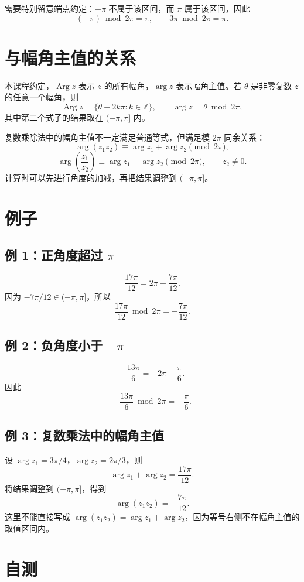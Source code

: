 \documentclass[UTF8,11pt]{ctexart}
\newcommand{\Z}{\mathbb{Z}}
\newcommand{\Arg}{\operatorname{Arg}}
\begin{document}
需要特别留意端点约定：$-\pi$ 不属于该区间，而 $\pi$ 属于该区间，因此
\[
(-\pi)\bmod 2\pi=\pi,
\qquad
3\pi\bmod 2\pi=\pi.
\]

\section{与幅角主值的关系}

本课程约定，$\Arg z$ 表示 $z$ 的所有幅角，$\arg z$ 表示幅角主值。若 $\theta$ 是非零复数 $z$ 的任意一个幅角，则
\[
\Arg z=\{\theta+2k\pi:k\in\Z\},
\qquad
\arg z=\theta\bmod 2\pi,
\]
其中第二个式子的结果取在 $(-\pi,\pi]$ 内。

复数乘除法中的幅角主值不一定满足普通等式，但满足模 $2\pi$ 同余关系：
\[
\arg(z_1z_2)\equiv\arg z_1+\arg z_2\pmod{2\pi},
\]
\[
\arg\left(\frac{z_1}{z_2}\right)
\equiv\arg z_1-\arg z_2\pmod{2\pi},
\qquad z_2\ne0.
\]
计算时可以先进行角度的加减，再把结果调整到 $(-\pi,\pi]$。

\section{例子}

\subsection*{例 1：正角度超过 $\pi$}
\[
\frac{17\pi}{12}=2\pi-\frac{7\pi}{12}.
\]
因为 $-7\pi/12\in(-\pi,\pi]$，所以
\[
\frac{17\pi}{12}\bmod 2\pi=-\frac{7\pi}{12}.
\]

\subsection*{例 2：负角度小于 $-\pi$}
\[
-\frac{13\pi}{6}=-2\pi-\frac{\pi}{6}.
\]
因此
\[
-\frac{13\pi}{6}\bmod 2\pi=-\frac{\pi}{6}.
\]

\subsection*{例 3：复数乘法中的幅角主值}

设 $\arg z_1=3\pi/4$，$\arg z_2=2\pi/3$，则
\[
\arg z_1+\arg z_2=\frac{17\pi}{12}.
\]
将结果调整到 $(-\pi,\pi]$，得到
\[
\arg(z_1z_2)=-\frac{7\pi}{12}.
\]
这里不能直接写成
\(
\arg(z_1z_2)=\arg z_1+\arg z_2
\)，因为等号右侧不在幅角主值的取值区间内。

\section{自测}
\end{document}
